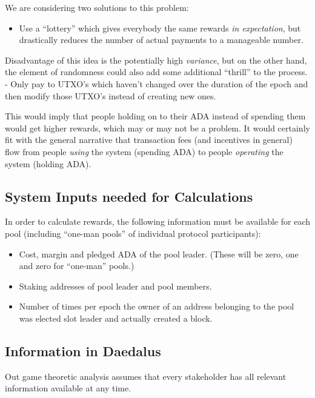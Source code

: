 \documentclass[11pt,a4paper]{article}
\begin{document}
We are considering two solutions to this problem:

\begin{itemize}
\item
  Use a ``lottery'' which gives everybody the same rewards \emph{in
  expectation}, but drastically reduces the number of actual payments to
  a manageable number.
\end{itemize}

Disadvantage of this idea is the potentially high \emph{variance}, but
on the other hand, the element of randomness could also add some
additional ``thrill'' to the process. - Only pay to UTXO's which haven't
changed over the duration of the epoch and then modify those UTXO's
instead of creating new ones.

This would imply that people holding on to their ADA instead of spending
them would get higher rewards, which may or may not be a problem. It
would certainly fit with the general narrative that transaction fees
(and incentives in general) flow from people \emph{using} the system
(spending ADA) to people \emph{operating} the system (holding ADA).

\subsection{System Inputs needed for
Calculations}\label{system-inputs-needed-for-calculations}

In order to calculate rewards, the following information must be
available for each pool (including ``one-man pools'' of individual
protocol participants):

\begin{itemize}
\item
  Cost, margin and pledged ADA of the pool leader. (These will be zero,
  one and zero for ``one-man'' pools.)
\item
  Staking addresses of pool leader and pool members.
\item
  Number of times per epoch the owner of an address belonging to the
  pool was elected slot leader and actually created a block.
\end{itemize}

\subsection{Information in Daedalus}\label{information-in-daedalus}

Out game theoretic analysis assumes that every stakeholder has all
relevant information available at any time.
\end{document}
